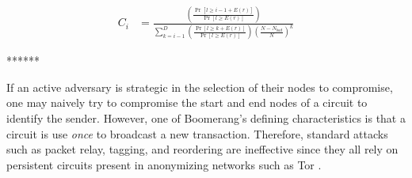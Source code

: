 \begin{align*}
C_i & = \frac{\left( \frac{ \Pr[l \geq i - 1 + E(r)] } { \Pr[l \geq E(r)] }\right)}{\sum_{k=i-1}^{D} \left( \frac{ \Pr[l \geq k + E(r)] } { \Pr[l \geq E(r)] }\right) \left(\frac{N - N_{bad}}{N}\right)^{k}}
\end{align*}

******


If an active adversary is strategic in the selection of their nodes to compromise, one may naively try to compromise the start and end nodes of a circuit to identify the sender. However, one of Boomerang's defining characteristics is that a circuit is use \emph{once} to broadcast a new transaction. Therefore, standard attacks such as packet relay, tagging, and reordering are ineffective since they all rely on persistent circuits present in anonymizing networks such as Tor \cite{tor}. 


